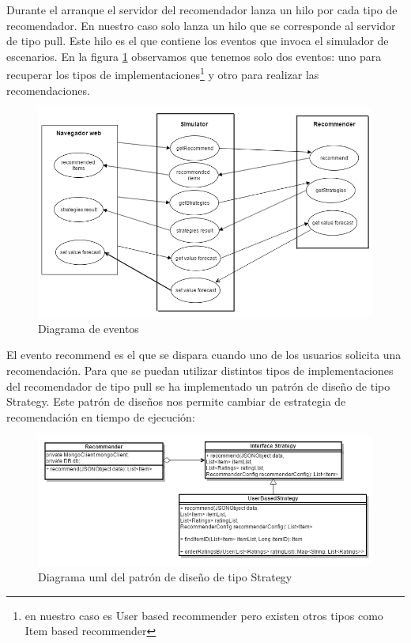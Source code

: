 Durante el arranque el servidor del recomendador lanza un hilo por cada tipo de recomendador. En nuestro caso solo lanza un hilo que se corresponde al servidor de tipo pull. Este hilo es el que contiene los eventos que invoca el simulador de escenarios. En la figura \ref{diagramaEventos} observamos que tenemos solo dos eventos: uno para recuperar los tipos de implementaciones\footnote{en nuestro caso es User based recommender pero existen otros tipos como Item based recommender} y otro para realizar las recomendaciones.

\begin{figure}[H]
\centering\includegraphics[scale=0.6]{imagenes/diagrama-de-eventos.png}
\caption{Diagrama de eventos}
\label{diagramaEventos}
\end{figure}

El evento recommend es el que se dispara cuando uno de los usuarios solicita una recomendación. Para que se puedan utilizar distintos tipos de implementaciones del recomendador de tipo pull se ha implementado un patrón de diseño de tipo Strategy. Este patrón de diseños nos permite cambiar de estrategia de recomendación en tiempo de ejecución:

\begin{figure}[H]
\includegraphics[scale=0.5]{imagenes/uml.png}
\caption{Diagrama uml del patrón de diseño de tipo Strategy}
\label{diagramaUMLStrategy}
\end{figure}

